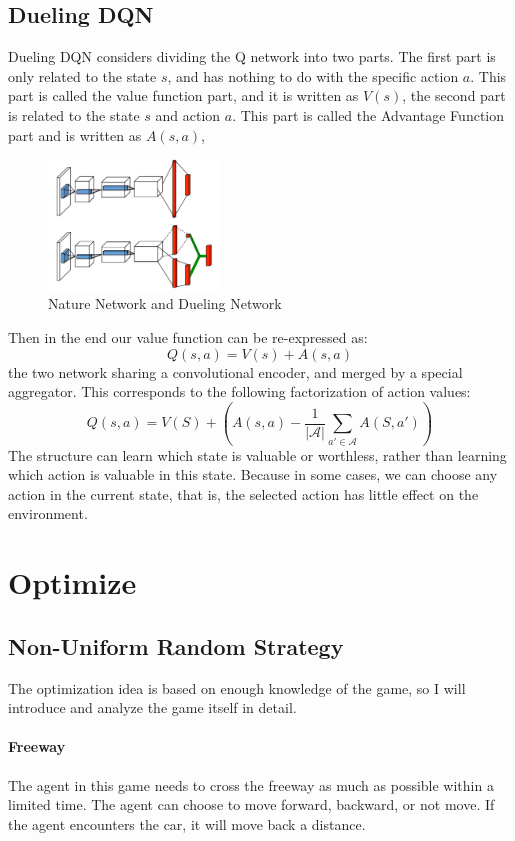 \documentclass{article}
\begin{document}
\subsection{Dueling DQN}
Dueling DQN considers dividing the Q network into two parts. The first part is only related to the state $s$, and has nothing to do with the specific action $a$. This part is called the value function part, and it is written as $V(s)$, the second part is related to the state $s$ and action $a$. This part is called the Advantage Function part and is written as $A(s, a)$, 
\begin{figure}[H]
\centering
\includegraphics[width=0.4\textwidth]{img/dueling dqn.png}
\caption{Nature Network and Dueling Network}
\label{Fig.main2}
\end{figure}
Then in the end our value function can be re-expressed as:
$$
Q(s, a) = V(s) + A(s, a)
$$
the two network sharing a convolutional encoder, and merged by a special aggregator. This corresponds to
the following factorization of action values:
$$
Q(s,a) = V(S) + (A(s,a) - \frac{1}{|\mathcal{A}|}\sum\limits_{a' \in \mathcal{A}}A(S,a'))
$$
The structure can learn which state is valuable or worthless, rather than learning which action is valuable in this state. Because in some cases, we can choose any action in the current state, that is, the selected action has little effect on the environment.

\section{Optimize}
\subsection{Non-Uniform Random Strategy}
The optimization idea is based on enough knowledge of the game, so I will introduce and analyze the game itself in detail. 
\paragraph{Freeway}
The agent in this game needs to cross the freeway as much as possible within a limited time. The agent can choose to move forward, backward, or not move. If the agent encounters the car, it will move back a distance.
\end{document}
